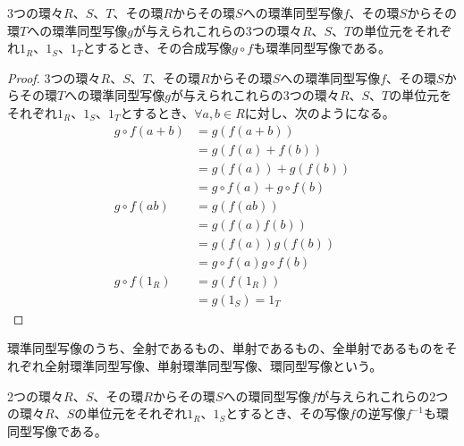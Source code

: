 \documentclass[dvipdfmx]{jsarticle}
\begin{document}
\begin{thm}\label{3.3.2.14}
3つの環々$R$、$S$、$T$、その環$R$からその環$S$への環準同型写像$f$、その環$S$からその環$T$への環準同型写像$g$が与えられこれらの3つの環々$R$、$S$、$T$の単位元をそれぞれ$1_{R}$、$1_{S}$、$1_{T}$とするとき、その合成写像$g \circ f$も環準同型写像である。
\end{thm}
\begin{proof}
3つの環々$R$、$S$、$T$、その環$R$からその環$S$への環準同型写像$f$、その環$S$からその環$T$への環準同型写像$g$が与えられこれらの3つの環々$R$、$S$、$T$の単位元をそれぞれ$1_{R}$、$1_{S}$、$1_{T}$とするとき、$\forall a,b \in R$に対し、次のようになる。
\begin{align*}
g \circ f(a + b) &= g\left( f(a + b) \right)\\
&= g\left( f(a) + f(b) \right)\\
&= g\left( f(a) \right) + g\left( f(b) \right)\\
&= g \circ f(a) + g \circ f(b)\\
g \circ f(ab) &= g\left( f(ab) \right)\\
&= g\left( f(a)f(b) \right)\\
&= g\left( f(a) \right)g\left( f(b) \right)\\
&= g \circ f(a)g \circ f(b)\\
g \circ f\left( 1_{R} \right) &= g\left( f\left( 1_{R} \right) \right)\\
&= g\left( 1_{S} \right) = 1_{T}
\end{align*}
\end{proof}
\begin{dfn}
環準同型写像のうち、全射であるもの、単射であるもの、全単射であるものをそれぞれ全射環準同型写像、単射環準同型写像、環同型写像という。
\end{dfn}
\begin{thm}\label{3.3.2.15}
2つの環々$R$、$S$、その環$R$からその環$S$への環同型写像$f$が与えられこれらの2つの環々$R$、$S$の単位元をそれぞれ$1_{R}$、$1_{S}$とするとき、その写像$f$の逆写像$f^{- 1}$も環同型写像である。
\end{thm}
\end{document}
